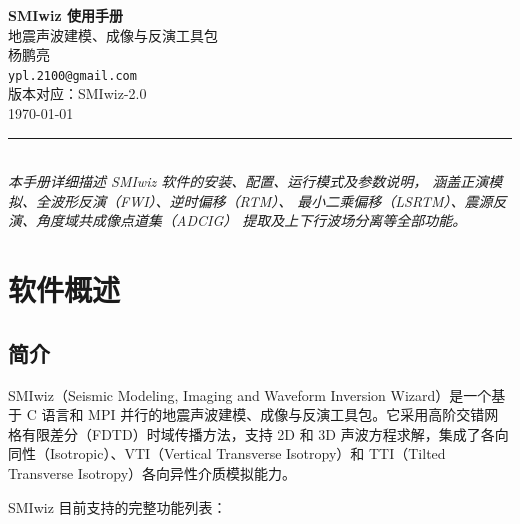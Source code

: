 \documentclass[11pt,a4paper]{ctexart}
\begin{document}
\begin{titlepage}
\centering
\vspace*{2cm}
{\Huge\bfseries SMIwiz 使用手册}\\[0.6cm]
{\Large 地震声波建模、成像与反演工具包}\\[1cm]
{\large 杨鹏亮}\\[0.2cm]
{\large \texttt{ypl.2100@gmail.com}}\\[0.2cm]
{\large 版本对应：SMIwiz-2.0}\\[0.2cm]
{\large \today}\\[1.5cm]
\noindent\rule{\textwidth}{0.5pt}\\[0.6cm]
{\large\itshape
本手册详细描述 SMIwiz 软件的安装、配置、运行模式及参数说明，
涵盖正演模拟、全波形反演（FWI）、逆时偏移（RTM）、
最小二乘偏移（LSRTM）、震源反演、角度域共成像点道集（ADCIG）
提取及上下行波场分离等全部功能。}
\end{titlepage}


\section{软件概述}

\subsection{简介}

SMIwiz（Seismic Modeling, Imaging and Waveform Inversion Wizard）是一个基于 C 语言和 MPI 并行的地震声波建模、成像与反演工具包。它采用高阶交错网格有限差分（FDTD）时域传播方法，支持 2D 和 3D 声波方程求解，集成了各向同性（Isotropic）、VTI（Vertical Transverse Isotropy）和 TTI（Tilted Transverse Isotropy）各向异性介质模拟能力。

SMIwiz 目前支持的完整功能列表：
\end{document}
